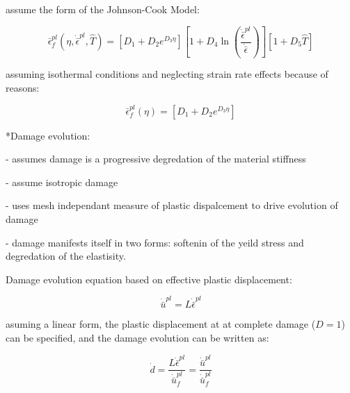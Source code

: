 assume the form of the Johnson-Cook Model:

\begin{equation}
\bar{\epsilon}_{f}^{pl}\left(\eta,\dot{\bar{\epsilon}}^{pl},\hat{T}\right)=\left[D_{1}+D_{2}e^{D_{3}\eta}\right]\left[1+D_{4}\ln\left(\frac{\dot{\bar{\epsilon}}^{pl}}{\dot{\bar{\epsilon}}}\right)\right]\left[1+D_{5}\hat{T}\right]\label{eqn:druc7}
\end{equation}


assuming isothermal conditions and neglecting strain rate effects
because of reasons:

\begin{equation}
\bar{\epsilon}_{f}^{pl}\left(\eta\right)=\left[D_{1}+D_{2}e^{D_{3}\eta}\right]\label{eqn:druc8}
\end{equation}


{*}Damage evolution:

- assumes damage is a progressive degredation of the material stiffness

- assume isotropic damage

- uses mesh independant measure of plastic dispalcement to drive evolution
of damage

- damage manifests itself in two forms: softenin of the yeild stress
and degredation of the elastisity.

Damage evolution equation based on effective plastic displacement:

\begin{equation}
\dot{\bar{u}}^{pl}=L\dot{\bar{\epsilon}}^{pl}\label{eqn:druc9}
\end{equation}


asuming a linear form, the plastic displacement at at complete damage
($D=1$) can be specified, and the damage evolution can be written
as:

\begin{equation}
\dot{d}=\frac{L\dot{\bar{\epsilon}}^{pl}}{\dot{\bar{u}}_{f}^{pl}}=\frac{\dot{\bar{u}}^{pl}}{\dot{\bar{u}}_{f}^{pl}}\label{eqn:druc9-1}
\end{equation}
